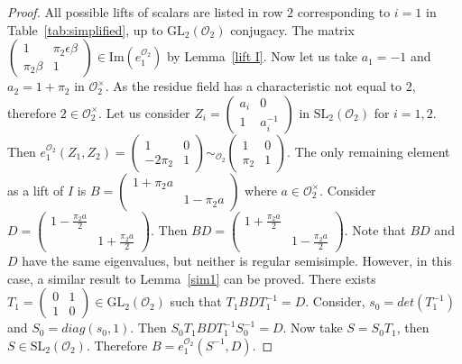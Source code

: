 \documentclass[10pt,twoside]{amsart}
\newcommand{\GL}{\mathrm{GL}}
\newcommand{\SL}{\mathrm{SL}}
\newcommand{\im}{\mathrm{Im}}
\newcommand{\R}{\mathcal{O}_2}
\theoremstyle{definition}
\theoremstyle{definition}
\begin{document}
\begin{proof}
All possible lifts of scalars are listed in row $2$ corresponding to $i = 1$ in Table~\ref{tab:simplified}, up to $\GL_2(\R)$ conjugacy. The matrix $ \left(\begin{array}{cc}
1 & \pi_2\epsilon\beta \\ \pi_2\beta & 1 
\end{array}\right)\in \im(e_1^{\R})$ by Lemma~\ref{lift I}. Now let us take $a_1 = -1$ and $a_2 = 1+ \pi_2$ in $\R^{\times}$. As the residue field has a characteristic not equal to $2$, therefore $2\in \R^{\times}$. Let us consider  $Z_i=\left(\begin{array}{cc}  a_i  & 0 \\ 1  & a_i^{-1} \end{array}\right)$ in $\SL_2(\R)$ for $i=1, 2$. Then $e_1^{\R}(Z_1, Z_2) = \left(\begin{array}{cc} 1  & 0 \\ -2\pi_2  & 1 \end{array} \right) \sim_{\R}\left(\begin{array}{cc} 1  & 0 \\ \pi_2  & 1 \end{array} \right)$. The only remaining element as a lift of $I$ is $B = \left(\begin{array}{cc} 1+\pi_2 a &  \\  & 1-\pi_2 a  \end{array}\right)$ where $a \in \R^{\times}$. Consider $D = \left(\begin{array}{cc} 1-\frac{\pi_2 a}{2} &  \\  & 1+\frac{\pi_2 a}{2} \end{array} \right)$. Then $BD = \left(\begin{array}{cc} 1+\frac{\pi_2 a}{2} &  \\
& 1-\frac{\pi_2 a}{2} \end{array}\right)$. Note that $BD$ and $D$ have the same eigenvalues, but neither is regular semisimple. However, in this case, a similar result to Lemma~\ref{sim1} can be proved. There exists $T_1=\left(\begin{array}{cc} 0 & 1 \\ 1 & 0 \end{array}\right)\in \GL_2(\R)$ such that $T_1 B DT_1^{-1} = D$. Consider,  $s_0 = det(T_1^{-1})$ and $S_0 = diag(s_0, 1)$. Then $S_0 T_1 B D T_1^{-1} S_0^{-1} = D$. Now take $S = S_0 T_1$, then $S\in \SL_2(\R)$. Therefore $B=e_1^{\R}(S^{-1},D)$. 
\end{proof}
\end{document}
